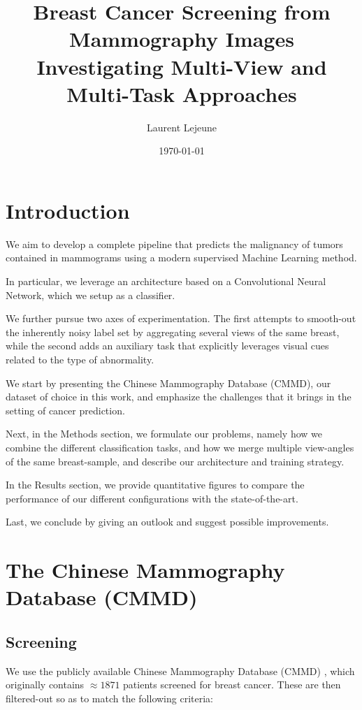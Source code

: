 \documentclass[11pt]{article}
\author{Laurent Lejeune}
\date{\today}
\title{Breast Cancer Screening from Mammography Images\\\medskip
\large Investigating Multi-View and Multi-Task Approaches}
\begin{document}
\maketitle
\tableofcontents


\section{Introduction}
\label{sec:orgd614602}

We aim to develop a complete pipeline that predicts the malignancy of tumors contained
in mammograms using a modern supervised Machine Learning method.

In particular, we leverage an architecture based on a Convolutional Neural Network,
which we setup as a classifier.

We further pursue two axes of experimentation. The first attempts to smooth-out the inherently
noisy label set by aggregating several views of the same breast, while the second
adds an auxiliary task that explicitly leverages visual cues related to the type of abnormality.

We start by presenting the Chinese Mammography Database (CMMD), our dataset of
choice in this work, and emphasize the challenges that it brings in the setting of cancer prediction.

Next, in the Methods section, we formulate our problems,
namely how we combine the different classification tasks, and how
we merge multiple view-angles of the same breast-sample,
and describe our architecture and training strategy.

In the Results section, we provide quantitative figures to compare the performance of our
different configurations with the state-of-the-art.

Last, we conclude by giving an outlook and suggest possible improvements.

\section{The Chinese Mammography Database (CMMD)}
\label{sec:orgbf2ec7d}

\subsection{\label{screening}Screening}
\label{sec:org9160640}

We use the publicly available Chinese Mammography Database (CMMD) \autocite{cai23},
which originally contains \(\approx 1871\) patients screened for breast cancer.
These are then filtered-out so as to match the following criteria:
\end{document}

